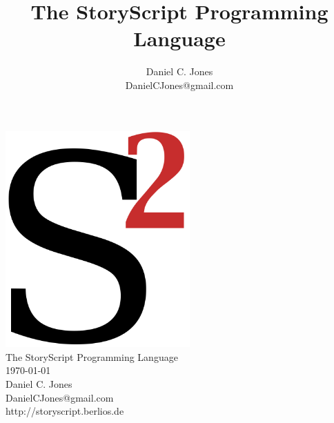 \documentclass{book}
\title{The StoryScript Programming Language}
\author{Daniel C. Jones\\DanielCJones@gmail.com}
\begin{document}
%
%

\begin{titlepage}

\begin{center}
\includegraphics[width=200pt]{graphics/SS-NewLogo}\\
\Large
The \textcolor{TitleRed}{StoryScript} Programming Language\\
\vspace{5em}
\large
\today \\
\vspace{10em}
\normalsize
Daniel C. Jones\\
DanielCJones@gmail.com\\
\vspace{2em}
http://storyscript.berlios.de
\end{center}

\end{titlepage}




%
%

\tableofcontents

%
%




%
%



%
%



%
%


\end{document}
